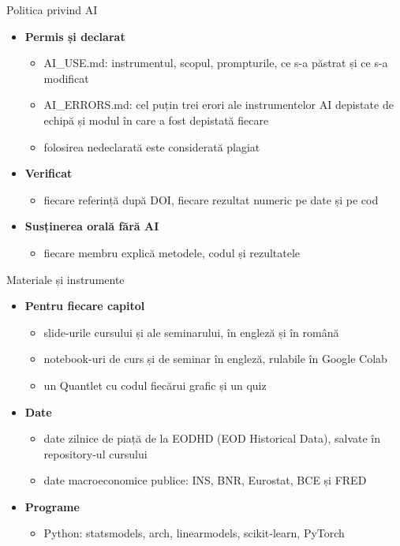 \begin{frame}{Politica privind AI}
\itemsize{\small}
\begin{itemize}
    \item \textbf{Permis și declarat}
    \begin{itemize}
        \item AI\_USE.md: instrumentul, scopul, prompturile, ce s-a păstrat și ce s-a modificat
        \item AI\_ERRORS.md: cel puțin trei erori ale instrumentelor AI depistate de echipă și modul în care a fost depistată fiecare
        \item folosirea nedeclarată este considerată plagiat
    \end{itemize}
    \item \textbf{Verificat}
    \begin{itemize}
        \item fiecare referință după DOI, fiecare rezultat numeric pe date și pe cod
    \end{itemize}
    \item \textbf{Susținerea orală fără AI}
    \begin{itemize}
        \item fiecare membru explică metodele, codul și rezultatele
    \end{itemize}
\end{itemize}
\end{frame}

\begin{frame}{Materiale și instrumente}
\itemsize{\small}
\begin{itemize}
    \item \textbf{Pentru fiecare capitol}
    \begin{itemize}
        \item slide-urile cursului și ale seminarului, în engleză și în română
        \item notebook-uri de curs și de seminar în engleză, rulabile în Google Colab
        \item un Quantlet cu codul fiecărui grafic și un quiz
    \end{itemize}
    \item \textbf{Date}
    \begin{itemize}
        \item date zilnice de piață de la EODHD (EOD Historical Data), salvate în repository-ul cursului
        \item date macroeconomice publice: INS, BNR, Eurostat, BCE și FRED
    \end{itemize}
    \item \textbf{Programe}
    \begin{itemize}
        \item Python: statsmodels, arch, linearmodels, scikit-learn, PyTorch
    \end{itemize}
\end{itemize}
\end{frame}


